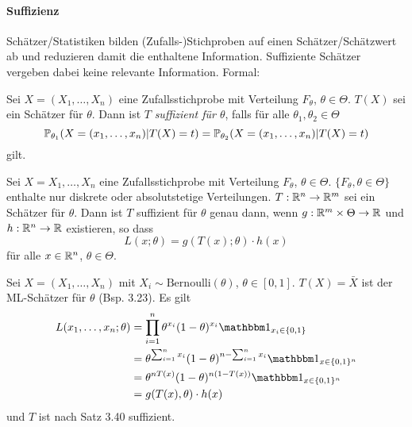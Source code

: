 \paragraph{Suffizienz} Schätzer/Statistiken bilden (Zufalls-)Stichproben auf
einen Schätzer/Schätzwert ab und reduzieren damit die enthaltene Information.
Suffiziente Schätzer vergeben dabei keine relevante Information. Formal:
\begin{defn} %
  Sei $X=(X_1,\ldots, X_n)$ eine Zufallsstichprobe mit Verteilung $F_\theta$,
  $\theta \in \Theta$. $T(X)$ sei ein Schätzer für $\theta$. Dann ist $T$
  \emph{suffizient für $\theta$}, falls für alle $\theta_1, \theta_2 \in \Theta$
  \[ \mathbb{P}_{\theta_1}( X = (x_1,\ldots, x_n) | T(X) = t ) =
    \mathbb{P}_{\theta_2}( X = (x_1, \ldots, x_n) | T(X)=t ) \]
  gilt.
\end{defn}

\begin{thm} %
  Sei $X = X_1, \ldots, X_n$ eine Zufallsstichprobe mit Verteilung $F_\theta$,
  $\theta \in \Theta$. $\{F_\theta, \theta \in \Theta\}$ enthalte nur diskrete
  oder absolutstetige Verteilungen. $T: \mathbb{R}^n \to \mathbb{R}^m$ sei ein Schätzer
  für $\theta$. Dann ist $T$ suffizient für $\theta$ genau dann, wenn
  $g : \mathbb{R}^m \times \Theta \to \mathbb{R}$ und $h: \mathbb{R}^n \to \mathbb{R}$ existieren,
  so dass
  \begin{equation} %
    L(x; \theta) = g(T(x);\theta) \cdot h(x)
  \end{equation}
  für alle $x \in \mathbb{R}^n$, $\theta \in \Theta$.
\end{thm}

\begin{exmp} %
  Sei $X=(X_1,\ldots,X_n)$ mit $X_i \sim \mathrm{Bernoulli}(\theta)$, $\theta
  \in [0,1]$. $T(X) = \bar{X}$ ist der ML-Schätzer für $\theta$ (Bsp. 3.23). Es
  gilt
  \begin{align*}
  L(x_1, \ldots, x_n; \theta)
    &= \prod_{i=1}^n \theta^{x_i} (1-\theta)^{x_i}
      \ind_{x_i \in \{0,1\}} \\
    &= \theta^{\sum_{i=1}^n x_i} (1-\theta)^{n - \sum_{i=1}^n x_i}
      \ind_{x \in \{0,1\}^n} \\
    &= \theta^{n T(x)} (1-\theta)^{n(1-T(x))}
      \ind_{x \in \{0,1\}^n} \\
    &= g(T(x), \theta) \cdot h(x)
  \end{align*}
  und $T$ ist nach Satz 3.40 suffizient.
\end{exmp}

